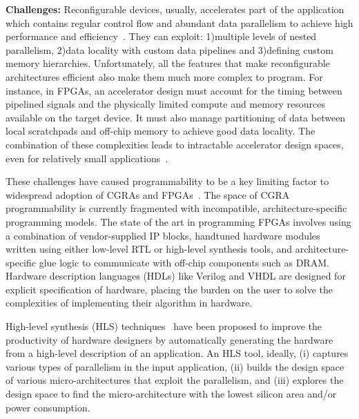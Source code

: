 \textbf{Challenges:}
Reconfigurable devices, usually, accelerates part of the application which contains regular control flow and abundant data parallelism to achieve high performance and efficiency~\cite{spatial_computation, trips, govindaraju_hpca_2011}.
They can exploit: 1)multiple levels of nested parallelism, 2)data locality with custom data pipelines and 3)defining custom memory hierarchies.
Unfortunately, all the features that make reconfigurable architectures efficient also make them much more complex to program.
For instance, in FPGAs, an accelerator design must account for the timing between pipelined signals and the physically limited compute and memory resources available on the target device.
It must also manage partitioning of data between local scratchpads and off-chip memory to achieve good data locality.
The combination of these complexities leads to intractable accelerator design spaces, even for relatively small applications~\cite{cascaval_taxonomy_accelerator}.


These challenges have caused programmability to be a key limiting factor to widespread adoption of CGRAs and FPGAs~\cite{fpgaMasses,DeSutter2013}. The space of CGRA programmability is currently fragmented with incompatible, architecture-specific programming models. The state of the art in programming FPGAs involves using a combination of vendor-supplied IP blocks, handtuned hardware modules written using either low-level RTL or high-level synthesis tools, and architecture-specific glue logic to communicate with off-chip components such as DRAM. Hardware description languages (HDLs) like Verilog and VHDL are designed for explicit specification of hardware, placing the burden on the user to solve the complexities of implementing their algorithm in hardware.


High-level synthesis (HLS) techniques~\cite{jcong_hls,canis_2011_legup, vivado} have been proposed to improve the productivity of hardware designers by automatically generating the hardware from a high-level description of an application. An HLS tool, ideally, (i) captures various types of parallelism in the input application, (ii) builds the design space of various micro-architectures that exploit the parallelism, and (iii) explores the design space to find the micro-architecture with the lowest silicon area and/or power consumption.

